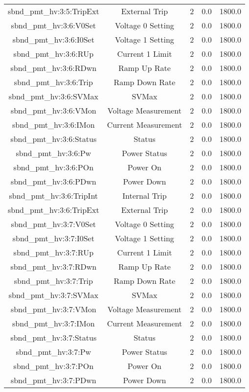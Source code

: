 \begin{table}[ptb]
\begin{tabular}{c | c c c c}
sbnd_pmt_hv:3:5:TripExt & External Trip & 2 & 0.0 & 1800.0\\ 
sbnd_pmt_hv:3:6:V0Set & Voltage 0 Setting & 2 & 0.0 & 1800.0\\ 
sbnd_pmt_hv:3:6:I0Set & Voltage 1 Setting & 2 & 0.0 & 1800.0\\ 
sbnd_pmt_hv:3:6:RUp & Current 1 Limit & 2 & 0.0 & 1800.0\\ 
sbnd_pmt_hv:3:6:RDwn & Ramp Up Rate & 2 & 0.0 & 1800.0\\ 
sbnd_pmt_hv:3:6:Trip & Ramp Down Rate & 2 & 0.0 & 1800.0\\ 
sbnd_pmt_hv:3:6:SVMax & SVMax & 2 & 0.0 & 1800.0\\ 
sbnd_pmt_hv:3:6:VMon & Voltage Measurement & 2 & 0.0 & 1800.0\\ 
sbnd_pmt_hv:3:6:IMon & Current Measurement & 2 & 0.0 & 1800.0\\ 
sbnd_pmt_hv:3:6:Status & Status & 2 & 0.0 & 1800.0\\ 
sbnd_pmt_hv:3:6:Pw & Power Status & 2 & 0.0 & 1800.0\\ 
sbnd_pmt_hv:3:6:POn & Power On & 2 & 0.0 & 1800.0\\ 
sbnd_pmt_hv:3:6:PDwn & Power Down & 2 & 0.0 & 1800.0\\ 
sbnd_pmt_hv:3:6:TripInt & Internal Trip & 2 & 0.0 & 1800.0\\ 
sbnd_pmt_hv:3:6:TripExt & External Trip & 2 & 0.0 & 1800.0\\ 
sbnd_pmt_hv:3:7:V0Set & Voltage 0 Setting & 2 & 0.0 & 1800.0\\ 
sbnd_pmt_hv:3:7:I0Set & Voltage 1 Setting & 2 & 0.0 & 1800.0\\ 
sbnd_pmt_hv:3:7:RUp & Current 1 Limit & 2 & 0.0 & 1800.0\\ 
sbnd_pmt_hv:3:7:RDwn & Ramp Up Rate & 2 & 0.0 & 1800.0\\ 
sbnd_pmt_hv:3:7:Trip & Ramp Down Rate & 2 & 0.0 & 1800.0\\ 
sbnd_pmt_hv:3:7:SVMax & SVMax & 2 & 0.0 & 1800.0\\ 
sbnd_pmt_hv:3:7:VMon & Voltage Measurement & 2 & 0.0 & 1800.0\\ 
sbnd_pmt_hv:3:7:IMon & Current Measurement & 2 & 0.0 & 1800.0\\ 
sbnd_pmt_hv:3:7:Status & Status & 2 & 0.0 & 1800.0\\ 
sbnd_pmt_hv:3:7:Pw & Power Status & 2 & 0.0 & 1800.0\\ 
sbnd_pmt_hv:3:7:POn & Power On & 2 & 0.0 & 1800.0\\ 
sbnd_pmt_hv:3:7:PDwn & Power Down & 2 & 0.0 & 1800.0\\ 

\end{tabular}
\end{table}
